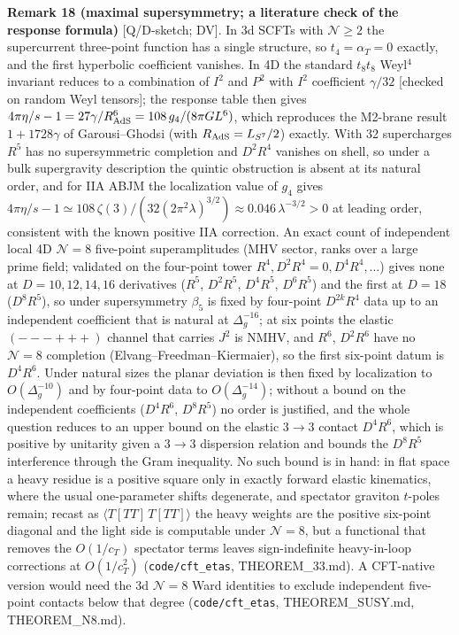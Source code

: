\textbf{Remark 18 (maximal supersymmetry; a literature check of the response formula)} [Q/D-sketch; DV]. In 3d SCFTs with $\mathcal N\ge2$ the
supercurrent three-point function has a single structure, so $t_4=\alpha_T=0$ exactly, and the first hyperbolic coefficient vanishes. In 4D the standard
$t_8t_8$ Weyl$^4$ invariant reduces to a combination of $I^2$ and $P^2$ with $I^2$ coefficient $\gamma/32$ [checked on random Weyl tensors]; the response
table then gives $4\pi\eta/s-1=27\gamma/R_{\rm AdS}^6=108\,g_4/(8\pi GL^6)$, which reproduces the M2-brane result $1+1728\gamma$ of Garousi--Ghodsi
(with $R_{\rm AdS}=L_{S^7}/2$) exactly. With 32 supercharges $R^5$ has no supersymmetric completion and $D^2R^4$ vanishes on shell, so under a bulk
supergravity description the quintic obstruction is absent at its natural order, and for IIA ABJM the localization value of $g_4$ gives
$4\pi\eta/s-1\simeq108\,\zeta(3)/(32(2\pi^2\lambda)^{3/2})\approx0.046\,\lambda^{-3/2}>0$ at leading order, consistent with the known positive IIA
correction. An exact count of independent local 4D $\mathcal N=8$ five-point superamplitudes (MHV sector, ranks over a large prime field; validated on the
four-point tower $R^4,D^2R^4\!=\!0,D^4R^4,\dots$) gives none at $D=10,12,14,16$ derivatives ($R^5$, $D^2R^5$, $D^4R^5$, $D^6R^5$) and the first at
$D=18$ ($D^8R^5$), so under supersymmetry $\beta_5$ is fixed by four-point $D^{2k}R^4$ data up to an independent coefficient that is natural at
$\Delta_g^{-16}$; at six points the elastic $(---+++)$ channel that carries $J^2$ is NMHV, and $R^6$, $D^2R^6$ have no $\mathcal N=8$ completion
(Elvang--Freedman--Kiermaier), so the first six-point datum is $D^4R^6$. Under natural sizes the planar deviation is then fixed by localization to
$O(\Delta_g^{-10})$ and by four-point data to $O(\Delta_g^{-14})$; without a bound on the independent coefficients ($D^4R^6$, $D^8R^5$) no order is
justified, and the whole question reduces to an upper bound on the elastic $3\to3$ contact $D^4R^6$, which is positive by unitarity given a $3\to3$
dispersion relation and bounds the $D^8R^5$ interference through the Gram inequality. No such bound is in hand: in flat space a heavy residue is a positive square only in exactly forward elastic kinematics, where
the usual one-parameter shifts degenerate, and spectator graviton $t$-poles remain; recast as $\langle T[TT]\,T[TT]\rangle$ the heavy weights are the
positive six-point diagonal and the light side is computable under $\mathcal N=8$, but a functional that removes the $O(1/c_T)$ spectator terms leaves
sign-indefinite heavy-in-loop corrections at $O(1/c_T^2)$ (\texttt{code/cft\_etas}, THEOREM\_33.md). A CFT-native version would need the 3d $\mathcal N=8$ Ward identities
to exclude independent five-point contacts below that degree (\texttt{code/cft\_etas}, THEOREM\_SUSY.md, THEOREM\_N8.md).

